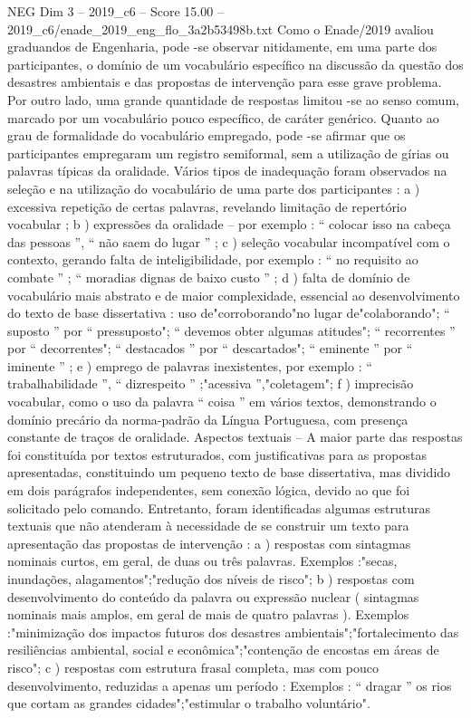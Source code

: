 \begin{textsample}{NEG Dim 3 – 2019\_c6 – Score 15.00 – 2019\_c6/enade\_2019\_eng\_flo\_3a2b53498b.txt}
Como o Enade/2019 avaliou graduandos de Engenharia, pode -se observar nitidamente, em uma parte dos participantes, o domínio de um vocabulário específico na discussão da questão dos desastres ambientais e das propostas de intervenção para esse grave problema.
Por outro lado, uma grande quantidade de respostas limitou -se ao senso comum, marcado por um vocabulário pouco específico, de caráter genérico.
Quanto ao grau de formalidade do vocabulário empregado, pode -se afirmar que os participantes empregaram um registro semiformal, sem a utilização de gírias ou palavras típicas da oralidade.
Vários tipos de inadequação foram observados na seleção e na utilização do vocabulário de uma parte dos participantes : a ) excessiva repetição de certas palavras, revelando limitação de repertório vocabular ; b ) expressões da oralidade – por exemplo : “ colocar isso na cabeça das pessoas ”, “ não saem do lugar ” ; c ) seleção vocabular incompatível com o contexto, gerando falta de inteligibilidade, por exemplo : “ no requisito ao combate ” ; “ moradias dignas de baixo custo ” ; d ) falta de domínio de vocabulário mais abstrato e de maior complexidade, essencial ao desenvolvimento do texto de base dissertativa : uso de"corroborando"no lugar de"colaborando"; “ suposto ” por “ pressuposto"; “ devemos obter algumas atitudes"; “ recorrentes ” por “ decorrentes"; “ destacados ” por “ descartados"; “ eminente ” por “ iminente ” ; e ) emprego de palavras inexistentes, por exemplo : “ trabalhabilidade ”, “ dizrespeito ” ;"acessiva ”,"coletagem"; f ) imprecisão vocabular, como o uso da palavra “ coisa ” em vários textos, demonstrando o domínio precário da norma-padrão da Língua Portuguesa, com presença constante de traços de oralidade.
Aspectos textuais – A maior parte das respostas foi constituída por textos estruturados, com justificativas para as propostas apresentadas, constituindo um pequeno texto de base dissertativa, mas dividido em dois parágrafos independentes, sem conexão lógica, devido ao que foi solicitado pelo comando.
Entretanto, foram identificadas algumas estruturas textuais que não atenderam à necessidade de se construir um texto para apresentação das propostas de intervenção : a ) respostas com sintagmas nominais curtos, em geral, de duas ou três palavras.
Exemplos :"secas, inundações, alagamentos";"redução dos níveis de risco"; b ) respostas com desenvolvimento do conteúdo da palavra ou expressão nuclear ( sintagmas nominais mais amplos, em geral de mais de quatro palavras ).
Exemplos :"minimização dos impactos futuros dos desastres ambientais";"fortalecimento das resiliências ambiental, social e econômica";"contenção de encostas em áreas de risco"; c ) respostas com estrutura frasal completa, mas com pouco desenvolvimento, reduzidas a apenas um período : Exemplos : “ dragar ” os rios que cortam as grandes cidades";"estimular o trabalho voluntário".

\end{textsample}
